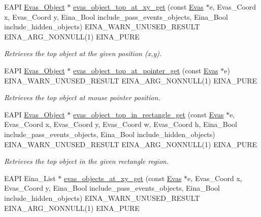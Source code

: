 \begin{DoxyCompactItemize}
EAPI \hyperlink{group__Evas__Object__Group_ga9e19e6dd1f517a0ba437c0114d3e7c97}{Evas\_\-Object} $\ast$ \hyperlink{group__Evas__Object__Group__Find_ga6028b55f1ec538feb45aa004ba916a54}{evas\_\-object\_\-top\_\-at\_\-xy\_\-get} (const \hyperlink{group__Evas__Canvas_ga5ff87cc4ce6bc43e3b640a6d37f73043}{Evas} $\ast$e, Evas\_\-Coord x, Evas\_\-Coord y, Eina\_\-Bool include\_\-pass\_\-events\_\-objects, Eina\_\-Bool include\_\-hidden\_\-objects) EINA\_\-WARN\_\-UNUSED\_\-RESULT EINA\_\-ARG\_\-NONNULL(1) EINA\_\-PURE
\begin{DoxyCompactList}\small\item\em Retrieves the top object at the given position (x,y). \item\end{DoxyCompactList}\item 
EAPI \hyperlink{group__Evas__Object__Group_ga9e19e6dd1f517a0ba437c0114d3e7c97}{Evas\_\-Object} $\ast$ \hyperlink{group__Evas__Object__Group__Find_ga6382adb2279892eb01029cef46988448}{evas\_\-object\_\-top\_\-at\_\-pointer\_\-get} (const \hyperlink{group__Evas__Canvas_ga5ff87cc4ce6bc43e3b640a6d37f73043}{Evas} $\ast$e) EINA\_\-WARN\_\-UNUSED\_\-RESULT EINA\_\-ARG\_\-NONNULL(1) EINA\_\-PURE
\begin{DoxyCompactList}\small\item\em Retrieves the top object at mouse pointer position. \item\end{DoxyCompactList}\item 
EAPI \hyperlink{group__Evas__Object__Group_ga9e19e6dd1f517a0ba437c0114d3e7c97}{Evas\_\-Object} $\ast$ \hyperlink{group__Evas__Object__Group__Find_gaf072ec206768d96c6f73a590e6af39c9}{evas\_\-object\_\-top\_\-in\_\-rectangle\_\-get} (const \hyperlink{group__Evas__Canvas_ga5ff87cc4ce6bc43e3b640a6d37f73043}{Evas} $\ast$e, Evas\_\-Coord x, Evas\_\-Coord y, Evas\_\-Coord w, Evas\_\-Coord h, Eina\_\-Bool include\_\-pass\_\-events\_\-objects, Eina\_\-Bool include\_\-hidden\_\-objects) EINA\_\-WARN\_\-UNUSED\_\-RESULT EINA\_\-ARG\_\-NONNULL(1) EINA\_\-PURE
\begin{DoxyCompactList}\small\item\em Retrieves the top object in the given rectangle region. \item\end{DoxyCompactList}\item 
EAPI Eina\_\-List $\ast$ \hyperlink{group__Evas__Object__Group__Find_ga473d00deb431d0869484474153e47c04}{evas\_\-objects\_\-at\_\-xy\_\-get} (const \hyperlink{group__Evas__Canvas_ga5ff87cc4ce6bc43e3b640a6d37f73043}{Evas} $\ast$e, Evas\_\-Coord x, Evas\_\-Coord y, Eina\_\-Bool include\_\-pass\_\-events\_\-objects, Eina\_\-Bool include\_\-hidden\_\-objects) EINA\_\-WARN\_\-UNUSED\_\-RESULT EINA\_\-ARG\_\-NONNULL(1) EINA\_\-PURE

\end{DoxyCompactItemize}

